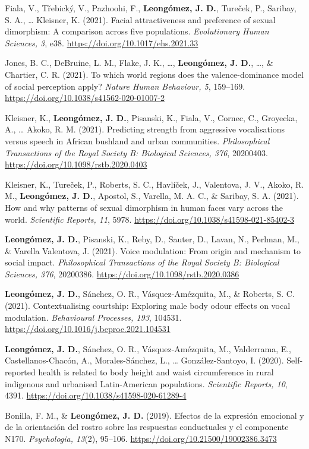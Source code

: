 \documentclass[11pt,a4paper,]{awesome-cv}
\begin{document}
Fiala, V., Třebický, V., Pazhoohi, F., \textbf{Leongómez, J. D.},
Tureček, P., Saribay, S. A., \ldots{} Kleisner, K. (2021). Facial
attractiveness and preference of sexual dimorphism: A comparison across
five populations. \emph{Evolutionary Human Sciences, 3}, e38.
\url{https://doi.org/10.1017/ehs.2021.33}

Jones, B. C., DeBruine, L. M., Flake, J. K., \ldots,
\textbf{Leongómez, J. D.}, \ldots, \& Chartier, C. R. (2021). To which
world regions does the valence-dominance model of social perception
apply? \emph{Nature Human Behaviour, 5}, 159--169.
\url{https://doi.org/10.1038/s41562-020-01007-2}

Kleisner, K., \textbf{Leongómez, J. D.}, Pisanski, K., Fiala, V.,
Cornec, C., Groyecka, A., \ldots{} Akoko, R. M. (2021). Predicting
strength from aggressive vocalisations versus speech in African bushland
and urban communities. \emph{Philosophical Transactions of the Royal
Society B: Biological Sciences, 376}, 20200403.
\url{https://doi.org/10.1098/rstb.2020.0403}

Kleisner, K., Tureček, P., Roberts, S. C., Havlíček, J., Valentova, J.
V., Akoko, R. M., \textbf{Leongómez, J. D.}, Apostol, S., Varella, M. A.
C., \& Saribay, S. A. (2021). How and why patterns of sexual dimorphism
in human faces vary across the world. \emph{Scientific Reports, 11},
5978. \url{https://doi.org/10.1038/s41598-021-85402-3}

\textbf{Leongómez, J. D.}, Pisanski, K., Reby, D., Sauter, D., Lavan,
N., Perlman, M., \& Varella Valentova, J. (2021). Voice modulation: From
origin and mechanism to social impact. \emph{Philosophical Transactions
of the Royal Society B: Biological Sciences, 376}, 20200386.
\url{https://doi.org/10.1098/rstb.2020.0386}

\textbf{Leongómez, J. D.}, Sánchez, O. R., Vásquez-Amézquita, M., \&
Roberts, S. C. (2021). Contextualising courtship: Exploring male body
odour effects on vocal modulation. \emph{Behavioural Processes, 193},
104531. \url{https://doi.org/10.1016/j.beproc.2021.104531}

\textbf{Leongómez, J. D.}, Sánchez, O. R., Vásquez-Amézquita, M.,
Valderrama, E., Castellanos-Chacón, A., Morales-Sánchez, L., \ldots{}
González-Santoyo, I. (2020). Self-reported health is related to body
height and waist circumference in rural indigenous and urbanised
Latin-American populations. \emph{Scientific Reports, 10}, 4391.
\url{https://doi.org/10.1038/s41598-020-61289-4}

Bonilla, F. M., \& \textbf{Leongómez, J. D.} (2019). Efectos de la
expresión emocional y de la orientación del rostro sobre las respuestas
conductuales y el componente N170. \emph{Psychologia, 13}(2), 95--106.
\url{https://doi.org/10.21500/19002386.3473}
\end{document}
